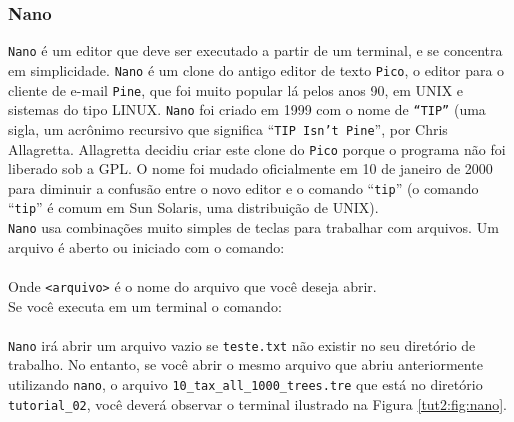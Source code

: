 \begin{refsection}

\subsubsection{Nano}\label{tut2:text:editors:nano}

\texttt{Nano} é um editor que deve ser executado a partir de um terminal, e se concentra em simplicidade. \texttt{Nano} é um clone do antigo editor de texto \texttt{Pico}, o editor para o cliente de e-mail \texttt{Pine}, que foi muito popular lá pelos anos 90, em UNIX e sistemas do tipo LINUX. \texttt{Nano} foi criado em 1999 com o nome de \texttt{``TIP''} (uma sigla, um acrônimo recursivo que significa ``\texttt{TIP Isn't Pine}'', por Chris Allagretta. Allagretta decidiu criar este clone do \texttt{Pico} porque o programa não foi liberado sob a GPL. O nome foi mudado oficialmente em 10 de janeiro de 2000 para diminuir a confusão entre o novo editor e o comando ``\texttt{tip}'' (o comando ``\texttt{tip}'' é comum em Sun Solaris, uma distribuição de UNIX).\\
\texttt{Nano} usa combinações muito simples de teclas para trabalhar com arquivos. Um arquivo é aberto ou iniciado com o comando: \\

\\

Onde \texttt{<arquivo>} é o nome do arquivo que você deseja abrir.\\
Se você executa em um terminal o comando:\\

\\

\texttt{Nano} irá abrir um arquivo vazio se \texttt{teste.txt} não existir no seu diretório de trabalho. No entanto, se você abrir o mesmo arquivo que abriu anteriormente utilizando \texttt{nano}, o arquivo \texttt{10\_tax\_all\_1000\_trees.tre} que está no diretório \texttt{tutorial\_02}, você deverá observar o terminal ilustrado na Figura \ref{tut2:fig:nano}.\\


\end{refsection}
